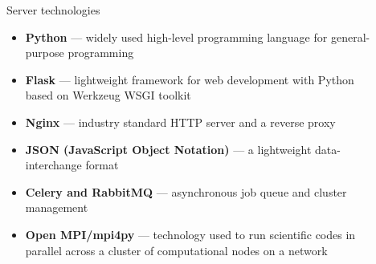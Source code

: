 \documentclass[final]{beamer}
\newlength{\sepwid}
\newlength{\onecolwid}
\newlength{\twocolwid}
\begin{document}
\begin{frame}[t]
\begin{columns}[t]
\begin{column}{\sepwid}\end{column} %

\begin{column}{\twocolwid} %

\begin{columns}[t,totalwidth=\twocolwid] %

\begin{column}{\onecolwid}\vspace{-.6in} %


\begin{block}{\faServer{} Server technologies}

\begin{itemize}
  \item \textbf{Python} --- widely used high-level programming language for general-purpose programming
  \item \textbf{Flask} --- lightweight framework for web development with Python based on Werkzeug WSGI toolkit
  \item \textbf{Nginx} --- industry standard HTTP server and a reverse proxy
  \item \textbf{JSON (JavaScript Object Notation)} --- a lightweight data-interchange format
  \item \textbf{Celery and RabbitMQ} --- asynchronous job queue and cluster management
  \item \textbf{Open MPI/mpi4py} --- technology used to run scientific codes in parallel across a cluster of computational nodes on a network
\end{itemize}

\end{block}


\end{column} %
%
\begin{column}{\onecolwid}\vspace{-.6in} %



\end{column}
\end{columns}
\end{column}
\end{columns}
\end{frame}
\end{document}
